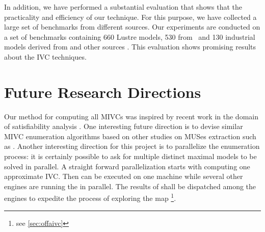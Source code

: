 In addition, we have performed a substantial evaluation that shows that the practicality and efficiency of our technique. For this purpose, we have collected a large set of benchmarks from different sources. Our experiments are conducted on a set of benchmarks containing 660 Lustre models, 530 from~\cite{Hagen08:FMCAD, piskac2016} and 130 industrial models derived from \cite{hilt2013} and other sources \cite{piskac2016, NFM2015:backes}. This evaluation shows promising results about the IVC techniques. 

\section{Future Research Directions}
Our method for computing all MIVCs was inspired by recent work in the domain of satisfiability analysis \cite{marco2016fast}. One interesting future direction is to devise similar MIVC enumeration algorithms based on other studies on MUSes extraction such as \cite{nadel2014accelerated}.
Another interesting direction for this project is to parallelize the enumeration process: it is certainly possible to ask for multiple distinct maximal models to be solved in parallel.
A straight forward parallelization starts with computing one approximate IVC. Then \mustalg can be executed on one machine while several other engines are running the \aivcalg in parallel. The results of \mustalg shall be dispatched among the engines to expedite the process of exploring the map \footnote{see \ref{sec:offaivc}}.

